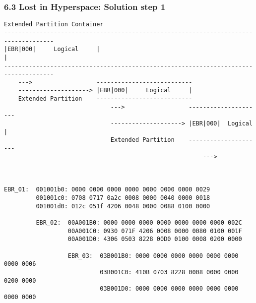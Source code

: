 \begin{frame}[fragile]
    \frametitle{6.3 Lost in Hyperspace: Solution step 1}
  \begin{lstlisting}[basicstyle=\tiny]
                           Extended Partition Container                          
------------------------------------------------------------------------------------
|EBR|000|     Logical     |                                                        |
------------------------------------------------------------------------------------
    --->                  ---------------------------
    --------------------> |EBR|000|     Logical     |
    Extended Partition    ---------------------------
                              --->                  ---------------------
                              --------------------> |EBR|000|  Logical  |
                              Extended Partition    ---------------------
                                                        --->



EBR_01:  001001b0: 0000 0000 0000 0000 0000 0000 0000 0029
         001001c0: 0708 0717 0a2c 0008 0000 0040 0000 0018
         001001d0: 012c 051f 4206 0048 0000 0088 0100 0000

         EBR_02:  00A001B0: 0000 0000 0000 0000 0000 0000 0000 002C
                  00A001C0: 0930 071F 4206 0008 0000 0080 0100 001F
                  00A001D0: 4306 0503 8228 00D0 0100 0008 0200 0000

                  EBR_03:  03B001B0: 0000 0000 0000 0000 0000 0000 0000 0006
                           03B001C0: 410B 0703 8228 0008 0000 0000 0200 0000
                           03B001D0: 0000 0000 0000 0000 0000 0000 0000 0000
  \end{lstlisting}
\end{frame}


